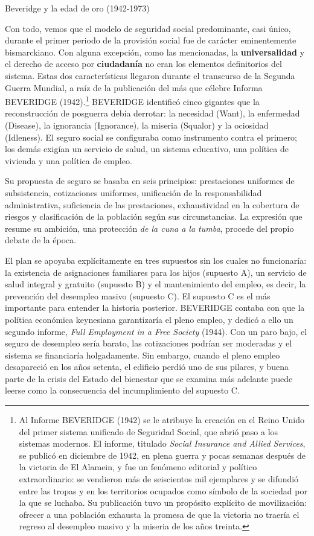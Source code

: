 \documentclass[10pt,a4paper]{article}
\begin{document}
Beveridge y la edad de oro (1942-1973)

Con todo, vemos que el modelo de seguridad social predominante, casi único, durante el primer periodo de la provisión social fue de carácter eminentemente bismarckiano. Con alguna excepción, como las mencionadas, la \textbf{universalidad} y el derecho de acceso por \textbf{ciudadanía} no eran los elementos definitorios del sistema. Estas dos características llegaron durante el transcurso de la Segunda Guerra Mundial, a raíz de la publicación del más que célebre Informa BEVERIDGE (1942).\footnote{Al Informe BEVERIDGE (1942) se le atribuye la creación en el Reino Unido del primer sistema unificado de Seguridad Social, que abrió paso a los sistemas modernos. El informe, titulado \textit{Social Insurance and Allied Services}, se publicó en diciembre de 1942, en plena guerra y pocas semanas después de la victoria de El Alamein, y fue un fenómeno editorial y político extraordinario: se vendieron más de seiscientos mil ejemplares y se difundió entre las tropas y en los territorios ocupados como símbolo de la sociedad por la que se luchaba. Su publicación tuvo un propósito explícito de movilización: ofrecer a una población exhausta la promesa de que la victoria no traería el regreso al desempleo masivo y la miseria de los años treinta.
} BEVERIDGE identificó cinco gigantes que la reconstrucción de posguerra debía derrotar: la necesidad (Want), la enfermedad (Disease), la ignorancia (Ignorance), la miseria (Squalor) y la ociosidad (Idleness). El seguro social se configuraba como instrumento contra el primero; los demás exigían un servicio de salud, un sistema educativo, una política de vivienda y una política de empleo. 

Su propuesta de seguro se basaba en seis principios: prestaciones uniformes de subsistencia, cotizaciones uniformes, unificación de la responsabilidad administrativa, suficiencia de las prestaciones, exhaustividad en la cobertura de riesgos y clasificación de la población según sus circunstancias. La expresión que resume su ambición, una protección \textit{de la cuna a la tumba}, procede del propio debate de la época.

El plan se apoyaba explícitamente en tres supuestos sin los cuales no funcionaría: la existencia de asignaciones familiares para los hijos (supuesto A), un servicio de salud integral y gratuito (supuesto B) y el mantenimiento del empleo, es decir, la prevención del desempleo masivo (supuesto C). El supuesto C es el más importante para entender la historia posterior. BEVERIDGE contaba con que la política económica keynesiana garantizaría el pleno empleo, y dedicó a ello un segundo informe, \textit{Full Employment in a Free Society} (1944). Con un paro bajo, el seguro de desempleo sería barato, las cotizaciones podrían ser moderadas y el sistema se financiaría holgadamente. Sin embargo, cuando el pleno empleo desapareció en los años setenta, el edificio perdió uno de sus pilares, y buena parte de la crisis del Estado del bienestar que se examina más adelante puede leerse como la consecuencia del incumplimiento del supuesto C.
\end{document}
